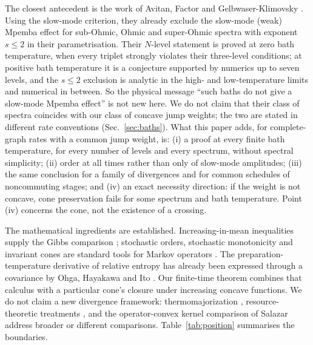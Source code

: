 \documentclass[11pt,a4paper]{article}
\theoremstyle{remark}\newtheorem{remark}[theorem]{Remark}
\begin{document}
The closest antecedent is the work of Avitan, Factor and Gelbwaser-Klimovsky \cite{Avitan2026}. Using the slow-mode criterion, they already exclude the slow-mode (weak) Mpemba effect for sub-Ohmic, Ohmic and super-Ohmic spectra with exponent $s\le2$ in their parametrisation. Their $N$-level statement is proved at zero bath temperature, when every triplet strongly violates their three-level conditions; at positive bath temperature it is a conjecture supported by numerics up to seven levels, and the $s\le2$ exclusion is analytic in the high- and low-temperature limits and numerical in between. So the physical message ``such baths do not give a slow-mode Mpemba effect'' is not new here. We do not claim that their class of spectra coincides with our class of concave jump weights; the two are stated in different rate conventions (Sec.~\ref{sec:baths}). What this paper adds, for complete-graph rates with a common jump weight, is: (i) a proof at every finite bath temperature, for every number of levels and every spectrum, without spectral simplicity; (ii) order at all times rather than only of slow-mode amplitudes; (iii) the same conclusion for a family of divergences and for common schedules of noncommuting stages; and (iv) an exact necessity direction: if the weight is not concave, cone preservation fails for some spectrum and bath temperature. Point (iv) concerns the cone, not the existence of a crossing.

The mathematical ingredients are established. Increasing-in-mean inequalities supply the Gibbs comparison \cite{Biernacki1951,Dragomir2004}; stochastic orders, stochastic monotonicity and invariant cones are standard tools for Markov operators \cite{Shaked2007,Daley1968,KeilsonKester1977,Massey1987,Lorek2012}. The preparation-temperature derivative of relative entropy has already been expressed through a covariance by Ohga, Hayakawa and Ito \cite[Appendix B]{Ohga2024}. Our finite-time theorem combines that calculus with a particular cone's closure under increasing concave functions. We do not claim a new divergence framework: thermomajorization \cite{Vu2025}, resource-theoretic treatments \cite{Summer2026}, and the operator-convex kernel comparison of Salazar \cite{Salazar2026} address broader or different comparisons. Table~\ref{tab:position} summarises the boundaries.
\end{document}
